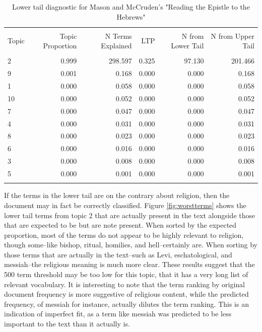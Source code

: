 \documentclass[]{book}
\theoremstyle{definition}
\theoremstyle{definition}
\theoremstyle{definition}
\theoremstyle{remark}
\begin{document}
\begin{table}[!htbp] \centering 
  \caption{Lower tail diagnostic for Mason and McCruden's "Reading the Epistle to the Hebrews"} 
  \label{tab:worstdoc} 
\begin{tabular}{@{\extracolsep{5pt}} lrrrrr} 
\\[-1.8ex]\hline 
\hline \\[-1.8ex] 
Topic & Topic Proportion & N Terms Explained & LTP & N from Lower Tail & N from Upper Tail \\ 
\hline \\[-1.8ex] 
2 & 0.999 & 298.597 & 0.325 & 97.130 & 201.466 \\ 
9 & 0.001 &   0.168 & 0.000 &  0.000 &   0.168 \\ 
1 & 0.000 &   0.058 & 0.000 &  0.000 &   0.058 \\ 
10 & 0.000 &   0.052 & 0.000 &  0.000 &   0.052 \\ 
7 & 0.000 &   0.047 & 0.000 &  0.000 &   0.047 \\ 
4 & 0.000 &   0.031 & 0.000 &  0.000 &   0.031 \\ 
8 & 0.000 &   0.023 & 0.000 &  0.000 &   0.023 \\ 
6 & 0.000 &   0.016 & 0.000 &  0.000 &   0.016 \\ 
3 & 0.000 &   0.008 & 0.000 &  0.000 &   0.008 \\ 
5 & 0.000 &   0.001 & 0.000 &  0.000 &   0.001 \\ 
\hline \\[-1.8ex] 
\end{tabular} 
\end{table}

If the terms in the lower tail are on the contrary about religion, then
the document may in fact be correctly classified. Figure
\ref{fig:worstterms} shows the lower tail terms from topic 2 that are
actually present in the text alongside those that are expected to be but
are note present. When sorted by the expected proportion, most of the
terms do not appear to be highly relevant to religion, though some--like
bishop, ritual, homilies, and hell--certainly are. When sorting by those
terms that are actually in the text--such as Levi, eschatological, and
messiah--the religious meaning is much more clear. These results suggest
that the 500 term threshold may be too low for this topic, that it has a
very long list of relevant vocabulary. It is interesting to note that
the term ranking by original document frequency is more suggestive of
religious content, while the predicted frequency, of messiah for
instance, actually dilutes the term ranking. This is an indication of
imperfect fit, as a term like messiah was predicted to be less important
to the text than it actually is.
\end{document}
